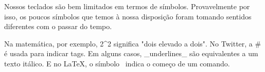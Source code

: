 \documentclass{minimal}
\begin{document}
Nossos teclados são bem limitados em termos de símbolos. Provavelmente por
isso, os poucos símbolos que temos à nossa disposição foram tomando sentidos
diferentes com o passar do tempo.

Na matemática, por exemplo, 2^2 significa "dois elevado a dois". No Twitter, a
# é usada para indicar tags. Em alguns casos, _underlines_ são equivalentes a
um texto itálico. E no \LaTeX, o símbolo \ indica o começo de um comando.
\end{document}
